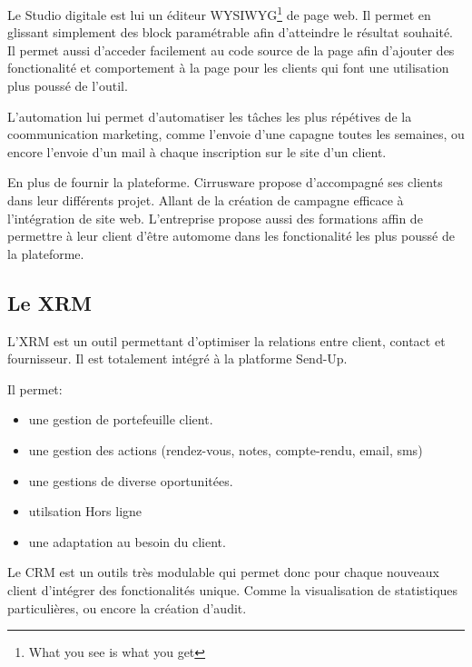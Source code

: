 Le Studio digitale est lui un éditeur WYSIWYG\footnote{What you see is what you get} de page web. Il permet en glissant simplement des block paramétrable afin d'atteindre le résultat souhaité. Il permet aussi d'acceder facilement au code source de la page afin d'ajouter des fonctionalité et comportement à la page pour les clients qui font une utilisation plus poussé de l'outil.

L'automation lui permet d'automatiser les tâches les plus répétives de la coommunication marketing, comme l'envoie d'une capagne toutes les semaines, ou encore l'envoie d'un mail à chaque inscription sur le site d'un client. 

En plus de fournir la plateforme. Cirrusware propose d'accompagné ses clients dans leur différents projet. Allant de la création de campagne efficace à l'intégration de site web. L'entreprise propose aussi des formations affin de permettre à leur client d'être automome dans les fonctionalité les plus poussé de la plateforme.

\subsection{Le XRM}
L'XRM est un outil permettant d'optimiser la relations entre client, contact et fournisseur. Il est totalement intégré à la platforme Send-Up.

Il permet: 
\begin{itemize}
    \item une gestion de portefeuille client. 
    \item une gestion des actions (rendez-vous, notes, compte-rendu, email, sms)
    \item une gestions de diverse oportunitées. 
    \item utilsation Hors ligne
    \item une adaptation au besoin du client. 
\end{itemize}

Le CRM est un outils très modulable qui permet donc pour chaque nouveaux client d'intégrer des fonctionalités unique. Comme la visualisation de statistiques particulières, ou encore la création d'audit.  

